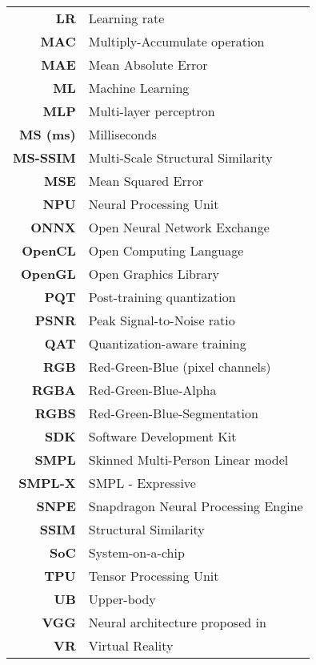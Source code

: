 \begin{changemargin}{-1.5cm}{0cm}
\begin{tabular}{>{\bf}r l@{}}
	LR & Learning rate \\
	MAC & Multiply-Accumulate operation \\
	MAE & Mean Absolute Error \\
	ML & Machine Learning \\
	MLP & Multi-layer perceptron \\
	MS (ms) & Milliseconds \\
	MS-SSIM & Multi-Scale Structural Similarity \\
	MSE & Mean Squared Error \\
	NPU & Neural Processing Unit \\
	ONNX & Open Neural Network Exchange \\
	OpenCL & Open Computing Language \\
	OpenGL & Open Graphics Library \\
	PQT & Post-training quantization \\
	PSNR & Peak Signal-to-Noise ratio \\
	QAT & Quantization-aware training \\
	RGB & Red-Green-Blue (pixel channels) \\
	RGBA & Red-Green-Blue-Alpha \\
	RGBS & Red-Green-Blue-Segmentation \\
	SDK & Software Development Kit \\
	SMPL & Skinned Multi-Person Linear model \cite{dnn:smpl15} \\
	SMPL-X & SMPL - Expressive \cite{dnn:smplx19}\\
	SNPE & Snapdragon Neural Processing Engine \\
	SSIM & Structural Similarity \\
	SoC & System-on-a-chip \\
	TPU & Tensor Processing Unit \\
	UB & Upper-body \\
	VGG & Neural architecture proposed in \cite{dnn:vgg14}\\
	VR & Virtual Reality \\
\end{tabular}
\end{changemargin}

